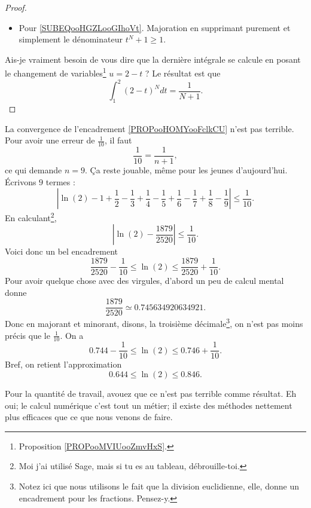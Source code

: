 \begin{proof}
\begin{itemize}
		\item Pour \ref{SUBEQooHGZLooGIhoVt}. Majoration en supprimant purement et simplement le dénominateur \( t^N+1\geq 1\).
	\end{itemize}
	Ais-je vraiment besoin de vous dire que la dernière intégrale se calcule en posant le changement de variables\footnote{Proposition \ref{PROPooMVIUooZmvHxS}.} \( u=2-t\) ? Le résultat est que
	\begin{equation}
		\int_1^2(2-t)^Ndt=\frac{1}{ N+1 }.
	\end{equation}
\end{proof}

\begin{example}      \label{EXooYMEEooMGpUNM}
	La convergence de l'encadrement \eqref{PROPooHOMYooFclkCU} n'est pas terrible. Pour avoir une erreur de \( \frac{1}{ 10 }\), il faut
	\begin{equation}
		\frac{1}{ 10 }=\frac{1}{ n+1 },
	\end{equation}
	ce qui demande \( n=9\). Ça reste jouable, même pour les jeunes d'aujourd'hui. Écrivons \( 9\) termes :
	\begin{equation}
		| \ln(2)-1+\frac{ 1 }{2}-\frac{1}{ 3 }+\frac{1}{ 4 }-\frac{1}{ 5 }+\frac{1}{ 6 }-\frac{ 1 }{ 7 }+\frac{1}{ 8 }-\frac{1}{ 9 } |\leq \frac{1}{ 10 }.
	\end{equation}
	En calculant\footnote{Moi j'ai utilisé Sage, mais si tu es au tableau, débrouille-toi.},
	\begin{equation}
		| \ln(2)-\frac{ 1879 }{ 2520 } |\leq\frac{1}{ 10 }.
	\end{equation}
	Voici donc un bel encadrement
	\begin{equation}
		\frac{ 1879 }{ 2520 }-\frac{1}{ 10 }\leq \ln(2)\leq \frac{ 1879 }{ 2520 }+\frac{1}{ 10 }.
	\end{equation}
	Pour avoir quelque chose avec des virgules, d'abord un peu de calcul mental donne
	\begin{equation}
		\frac{ 1879 }{ 2520 }\simeq 0.745634920634921.
	\end{equation}
	Donc en majorant et minorant, disons, la troisième décimale\footnote{Notez ici que nous utilisons le fait que la division euclidienne, elle, donne un encadrement pour les fractions. Pensez-y.}, on n'est pas moins précis que le \( \frac{1}{ 10 }\). On a
	\begin{equation}
		0.744-\frac{1}{ 10 }\leq \ln(2)\leq 0.746+\frac{1}{ 10 }.
	\end{equation}
	Bref, on retient l'approximation
	\begin{equation}
		0.644\leq \ln(2)\leq 0.846.
	\end{equation}

	Pour la quantité de travail, avouez que ce n'est pas terrible comme résultat. Eh oui; le calcul numérique c'est tout un métier; il existe des méthodes nettement plus efficaces que ce que nous venons de faire.
\end{example}


